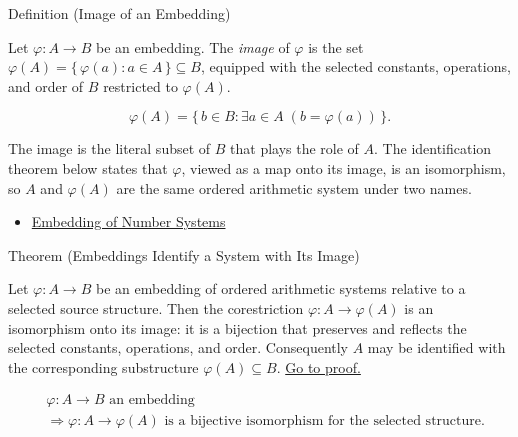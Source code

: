\begin{definitionbox}{Definition (Image of an Embedding)}
\begin{definition}
\label{def:image-of-embedding}
Let $\varphi:A\to B$ be an embedding. The \emph{image} of $\varphi$ is the set $\varphi(A)=\{\,\varphi(a) : a\in A\,\}\subseteq B$, equipped with the selected constants, operations, and order of $B$ restricted to $\varphi(A)$.
\end{definition}
\end{definitionbox}
\begin{remark*}
\[
\varphi(A)=\{\,b\in B:\exists a\in A\;(b=\varphi(a))\,\}.
\]
\end{remark*}
\begin{remark*}[Interpretation]
The image is the literal subset of $B$ that plays the role of $A$. The identification theorem below states that $\varphi$, viewed as a map onto its image, is an isomorphism, so $A$ and $\varphi(A)$ are the same ordered arithmetic system under two names.
\end{remark*}
\begin{dependencies}
\begin{itemize}
  \item \hyperref[def:number-system-embedding]{Embedding of Number Systems}
\end{itemize}
\end{dependencies}
\begin{theorembox}{Theorem (Embeddings Identify a System with Its Image)}
\begin{theorem}
\label{thm:embedding-identifies-with-image}
Let $\varphi:A\to B$ be an embedding of ordered arithmetic systems relative to
a selected source structure. Then the corestriction $\varphi:A\to\varphi(A)$
is an isomorphism onto its image: it is a bijection that preserves and reflects
the selected constants, operations, and order. Consequently $A$ may be
identified with the corresponding substructure $\varphi(A)\subseteq B$.
\hyperref[prf:embedding-identifies-with-image]{Go to proof.}
\end{theorem}
\end{theorembox}
\begin{remark*}
\[
\begin{aligned}
&\varphi:A\to B \text{ an embedding}\\
&\Longrightarrow \varphi:A\to\varphi(A) \text{ is a bijective isomorphism for the selected structure.}
\end{aligned}
\]
\end{remark*}
